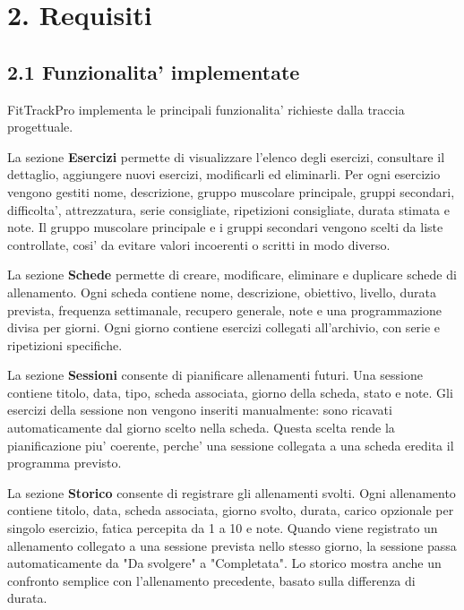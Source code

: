 \documentclass[11pt,a4paper]{article}
\begin{document}
\section{2. Requisiti}

\subsection{2.1 Funzionalita' implementate}

FitTrackPro implementa le principali funzionalita' richieste dalla traccia progettuale.

La sezione \textbf{Esercizi} permette di visualizzare l'elenco degli esercizi, consultare il dettaglio, aggiungere nuovi esercizi, modificarli ed eliminarli. Per ogni esercizio vengono gestiti nome, descrizione, gruppo muscolare principale, gruppi secondari, difficolta', attrezzatura, serie consigliate, ripetizioni consigliate, durata stimata e note. Il gruppo muscolare principale e i gruppi secondari vengono scelti da liste controllate, cosi' da evitare valori incoerenti o scritti in modo diverso.

La sezione \textbf{Schede} permette di creare, modificare, eliminare e duplicare schede di allenamento. Ogni scheda contiene nome, descrizione, obiettivo, livello, durata prevista, frequenza settimanale, recupero generale, note e una programmazione divisa per giorni. Ogni giorno contiene esercizi collegati all'archivio, con serie e ripetizioni specifiche.

La sezione \textbf{Sessioni} consente di pianificare allenamenti futuri. Una sessione contiene titolo, data, tipo, scheda associata, giorno della scheda, stato e note. Gli esercizi della sessione non vengono inseriti manualmente: sono ricavati automaticamente dal giorno scelto nella scheda. Questa scelta rende la pianificazione piu' coerente, perche' una sessione collegata a una scheda eredita il programma previsto.

La sezione \textbf{Storico} consente di registrare gli allenamenti svolti. Ogni allenamento contiene titolo, data, scheda associata, giorno svolto, durata, carico opzionale per singolo esercizio, fatica percepita da 1 a 10 e note. Quando viene registrato un allenamento collegato a una sessione prevista nello stesso giorno, la sessione passa automaticamente da "Da svolgere" a "Completata". Lo storico mostra anche un confronto semplice con l'allenamento precedente, basato sulla differenza di durata.
\end{document}
